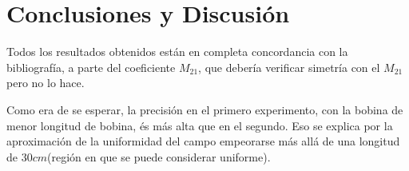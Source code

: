 \documentclass[a4paper,12pt]{article}
\begin{document}
\section{Conclusiones y Discusión}
Todos los resultados obtenidos están en completa concordancia con la bibliografía, a parte del coeficiente $M_{21}$, que debería verificar simetría con el $M_{21}$ pero no lo hace. 

Como era de se esperar, la precisión en el primero experimento, con la bobina de menor longitud de bobina, és más alta que en el segundo. Eso se explica por la aproximación de la uniformidad del campo empeorarse más allá de una longitud de $30cm$(región en que se puede considerar uniforme).

\printbibliography
\end{document}
